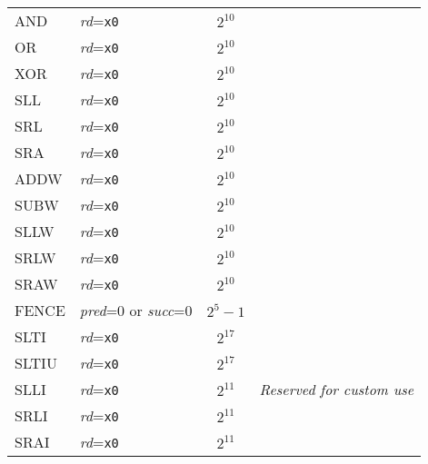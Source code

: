 \begin{table}[hbt]
\begin{tabular}{|l|l|c|l|}
  AND                   & {\em rd}={\tt x0}                           & $2^{10}$                    & \\ \cline{1-3}
  OR                    & {\em rd}={\tt x0}                           & $2^{10}$                    & \\ \cline{1-3}
  XOR                   & {\em rd}={\tt x0}                           & $2^{10}$                    & \\ \cline{1-3}
  SLL                   & {\em rd}={\tt x0}                           & $2^{10}$                    & \\ \cline{1-3}
  SRL                   & {\em rd}={\tt x0}                           & $2^{10}$                    & \\ \cline{1-3}
  SRA                   & {\em rd}={\tt x0}                           & $2^{10}$                    & \\ \cline{1-3}
  ADDW                  & {\em rd}={\tt x0}                           & $2^{10}$                    & \\ \cline{1-3}
  SUBW                  & {\em rd}={\tt x0}                           & $2^{10}$                    & \\ \cline{1-3}
  SLLW                  & {\em rd}={\tt x0}                           & $2^{10}$                    & \\ \cline{1-3}
  SRLW                  & {\em rd}={\tt x0}                           & $2^{10}$                    & \\ \cline{1-3}
  SRAW                  & {\em rd}={\tt x0}                           & $2^{10}$                    & \\ \cline{1-3}
  FENCE                 & {\em pred}=0 or {\em succ}=0                & $2^{5}-1$                   & \\ \hline \hline
  SLTI                  & {\em rd}={\tt x0}                           & $2^{17}$                    & \multirow{10}{*}{\em Reserved for custom use} \\ \cline{1-3}
  SLTIU                 & {\em rd}={\tt x0}                           & $2^{17}$                    & \\ \cline{1-3}
  SLLI                  & {\em rd}={\tt x0}                           & $2^{11}$                    & \\ \cline{1-3}
  SRLI                  & {\em rd}={\tt x0}                           & $2^{11}$                    & \\ \cline{1-3}
  SRAI                  & {\em rd}={\tt x0}                           & $2^{11}$                    & \\ \cline{1-3}

\end{tabular}
\end{table}
